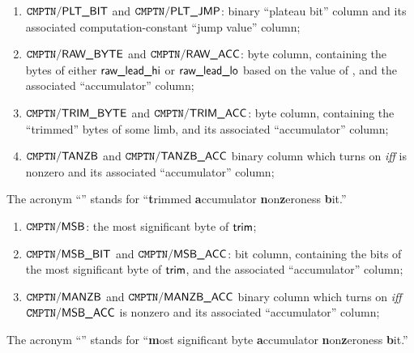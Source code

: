 \begin{enumerate}[resume]
      \item $\texttt{CMPTN}\textsf{/}{\textsf{PLT\_BIT}}$ and $\texttt{CMPTN}\textsf{/}{\textsf{PLT\_JMP}}$:
            binary ``plateau bit'' column and its associated computation-constant ``jump value'' column;
      \item $\texttt{CMPTN}\textsf{/}{\textsf{\textsf{RAW\_}\textsf{BYTE}}}$ and $\texttt{CMPTN}\textsf{/}{\textsf{\textsf{RAW\_}\textsf{ACC}}}$:
            byte column, containing the bytes of either $\textsf{raw\_}\textsf{lead}\textsf{\_hi}$ or $\textsf{raw\_}\textsf{lead}\textsf{\_lo}$ based on the value of \locMinCutoff{}, and the associated ``accumulator'' column;
      \item $\texttt{CMPTN}\textsf{/}{\textsf{\textsf{TRIM\_}\textsf{BYTE}}}$ and $\texttt{CMPTN}\textsf{/}{\textsf{\textsf{TRIM\_}\textsf{ACC}}}$:
            byte column, containing the ``trimmed'' bytes of some limb, and its associated ``accumulator'' column;
      \item $\texttt{CMPTN}\textsf{/}{\textsf{TANZB}}$ and $\texttt{CMPTN}\textsf{/}{\textsf{TANZB\_ACC}}$
            binary column which turns on \emph{iff} \compTrimAcc{} is nonzero and its associated ``accumulator'' column;
\end{enumerate}
The acronym ``'' stands for ``\textbf{t}rimmed \textbf{a}ccumulator \textbf{n}on\textbf{z}eroness \textbf{b}it.''
\begin{enumerate}[resume]
      \item $\texttt{CMPTN}\textsf{/}{\textsf{\textsf{MSB}}}$:
            the most significant byte of $\textsf{trim}$;
      \item $\texttt{CMPTN}\textsf{/}{\textsf{\textsf{MSB\_BIT}}}$ and $\texttt{CMPTN}\textsf{/}{\textsf{\textsf{MSB\_}\textsf{ACC}}}$:
            bit column, containing the bits of the most significant byte of $\textsf{trim}$, and the associated ``accumulator'' column;
      \item $\texttt{CMPTN}\textsf{/}{\textsf{MANZB}}$ and $\texttt{CMPTN}\textsf{/}{\textsf{MANZB\_ACC}}$
            binary column which turns on \emph{iff} $\texttt{CMPTN}\textsf{/}{\textsf{\textsf{MSB\_}\textsf{ACC}}}$ is nonzero and its associated ``accumulator'' column;
\end{enumerate}
The acronym ``'' stands for ``\textbf{m}ost significant byte \textbf{a}ccumulator \textbf{n}on\textbf{z}eroness \textbf{b}it.''
